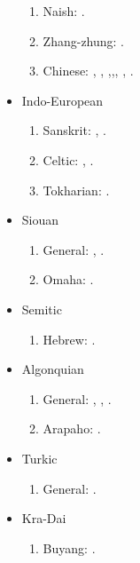 \documentclass[oneside,a4paper,11pt]{article}
\newcommand{\langue}[2]{#1}
\begin{document}
\begin{itemize}
\begin{enumerate}
\item Naish: \citet{jacques.michaud11naish}.
\item  Zhang-zhung: \citet{jacques09zz}.
\item \langue{Chinese}{Chinois}:  \citet{jacques00ywij},  \citet{jacques03dissimilation},   \citet{jacques14honey},\citet{jacques15sr},\citet{jacques17genetic}, \citet{jacques17traditional}, \citet{jacques17buyang}.
\end{enumerate}
\item \langue{Indo-European}{Indo-européen}
\begin{enumerate}
\item Sanskrit: \citet{jacques13vama}, \citet{jacques16camara}.
\item \langue{Celtic}{Celtique}: \citet{michaud-jacques12nasalite}, \citet{jacques15cochon}.
\item \langue{Tokharian}{Tocharien}: \citet{jacques14honey}.
\end{enumerate}
\item \langue{Siouan}{Sioux}
\begin{enumerate}
\item \langue{General}{Général}: \citet{jacques12bear},      \citet{michaud-jacques12nasalite}.  
\item Omaha: \citet{jacques16ebde}.
\end{enumerate}
\item \langue{Semitic}{Sémitique}
\begin{enumerate}
\item \langue{Hebrew}{Hébreu}: \citet{rg-gj12yod}.
\end{enumerate}
\item \langue{Algonquian}{Algonquien}
\begin{enumerate}
\item \langue{General}{Général}: \citet{jacques12bear}, \citet{jacques14inverse}, \citet{jacques17directionality}.
\item Arapaho: \citet{jacques13arapaho}.
\end{enumerate}
\item  \langue{Turkic}{Turcique}
\begin{enumerate}
\item  \langue{General}{Général}: \citet{antonov12kumush}.
\end{enumerate}
\item Kra-Dai
\begin{enumerate}
\item Buyang: \citet{jacques17buyang}.
\end{enumerate}
\end{itemize} 
 
\end{document}

